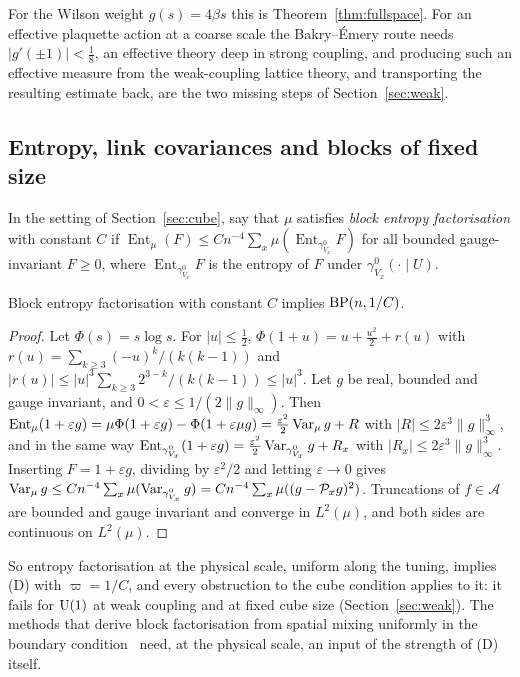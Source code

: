 For the Wilson weight $g(s)=4\beta s$ this is Theorem~\ref{thm:fullspace}. For
an effective plaquette action at a coarse scale the Bakry--\'Emery route needs
$|g'(\pm1)|<\frac18$, an effective theory deep in strong coupling, and producing
such an effective measure from the weak-coupling lattice theory, and
transporting the resulting estimate back, are the two missing steps of
Section~\ref{sec:weak}.

\subsection{Entropy, link covariances and blocks of fixed size}
\label{ssec:entropy}

In the setting of Section~\ref{sec:cube}, say that $\mu$ satisfies \emph{block
entropy factorisation} with constant $C$ if $\operatorname{Ent}_\mu(F)\le C
n^{-4}\sum_x\mu(\operatorname{Ent}_{\gamma^0_{V_x}}F)$ for all bounded
gauge-invariant $F\ge0$, where $\operatorname{Ent}_{\gamma^0_{V_x}}F$ is the
entropy of $F$ under $\gamma^0_{V_x}(\cdot\mid U)$.

\begin{proposition}\label{prop:entbp}
Block entropy factorisation with constant $C$ implies $\mathrm{BP}(n,1/C)$.
\end{proposition}

\begin{proof}
Let $\Phi(s)=s\log s$. For $|u|\le\frac12$, $\Phi(1+u)=u+\frac{u^2}2+r(u)$ with
$r(u)=\sum_{k\ge3}(-u)^k/(k(k-1))$ and $|r(u)|\le|u|^3\sum_{k\ge3}2^{3-k}/(k(k-1))
\le|u|^3$. Let $g$ be real, bounded and gauge invariant, and $0<\varepsilon\le1/
(2\|g\|_\infty)$. Then $\operatorname{Ent}_\mu(1+\varepsilon g)=\mu\Phi(1+
\varepsilon g)-\Phi(1+\varepsilon\mu g)=\frac{\varepsilon^2}2\operatorname{Var}_\mu g+R$ with
$|R|\le2\varepsilon^3\|g\|_\infty^3$, and in the same way
$\operatorname{Ent}_{\gamma^0_{V_x}}(1+\varepsilon g)=\frac{\varepsilon^2}2
\operatorname{Var}_{\gamma^0_{V_x}}g+R_x$ with $|R_x|\le2\varepsilon^3\|g\|_\infty^3$. Inserting
$F=1+\varepsilon g$, dividing by $\varepsilon^2/2$ and letting $\varepsilon\to0$
gives $\operatorname{Var}_\mu g\le Cn^{-4}\sum_x\mu(\operatorname{Var}_{\gamma^0_{V_x}}g)=Cn^{-4}\sum_x\mu((g-
\mathcal P_xg)^2)$. Truncations of $f\in\mathcal A$ are bounded and gauge
invariant and converge in $L^2(\mu)$, and both sides are continuous on
$L^2(\mu)$.
\end{proof}

So entropy factorisation at the physical scale, uniform along the tuning,
implies (D) with $\varpi=1/C$, and every obstruction to the cube condition
applies to it: it fails for $\mathrm{U}(1)$ at weak coupling and at fixed cube size
(Section~\ref{sec:weak}). The methods that derive block factorisation from
spatial mixing uniformly in the boundary condition~\cite{CP21} need, at the
physical scale, an input of the strength of (D) itself.

